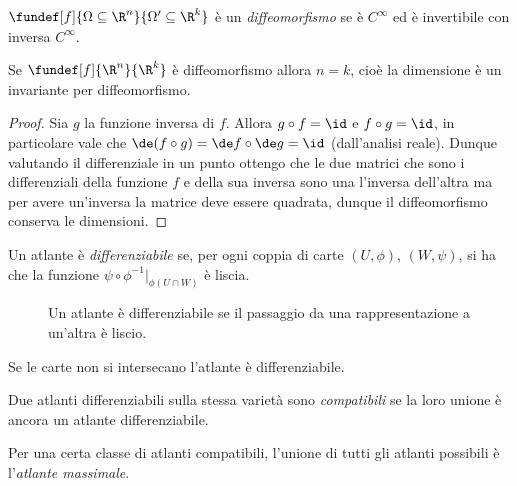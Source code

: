 \begin{defn}[Diffeomorfismo]
	$\fundef[f]{\Omega \subseteq \R^n}{\Omega' \subseteq \R^k}$ è un \emph{diffeomorfismo}
	se è $C^\infty$ ed è invertibile con inversa $C^{\infty}$.
\end{defn}

\begin{prop}
	Se $\fundef[f]{\R^n}{\R^k}$ è diffeomorfismo allora $n = k$,
	cioè la dimensione è un invariante per diffeomorfismo.
\end{prop}

\begin{proof}
	Sia $g$ la funzione inversa di $f$.
	Allora $g \circ f = \id$ e $f \circ g = \id$,
	in particolare vale che $\de(f \circ g) = \de f \circ \de g = \id$ (dall'analisi reale).
	Dunque valutando il differenziale in un punto ottengo che le due matrici
	che sono i differenziali della funzione $f$ e della sua inversa
	sono una l'inversa dell'altra ma per avere un'inversa la matrice deve essere quadrata,
	dunque il diffeomorfismo conserva le dimensioni.
\end{proof}

\begin{defn}
	Un atlante è \emph{differenziabile} se,
	per ogni coppia di carte $(U,\phi)$, $(W,\psi)$, si ha che la funzione
	$\psi\circ\phi^{-1}|_{\phi(U\cap W)}$ è liscia.\footnotemark
	\begin{figure}
    \centering
    
    \caption{Un atlante è differenziabile se il passaggio da una rappresentazione a un'altra è liscio.}
	\end{figure}
\end{defn}

\begin{oss}
	Se le carte non si intersecano l'atlante è differenziabile.
\end{oss}

\begin{defn}
Due atlanti differenziabili sulla stessa varietà sono \emph{compatibili} se la loro unione è ancora un atlante differenziabile.
\end{defn}

\begin{defn}
	Per una certa classe di atlanti compatibili,
	l'unione di tutti gli atlanti possibili è l'\emph{atlante massimale}.
\end{defn}

